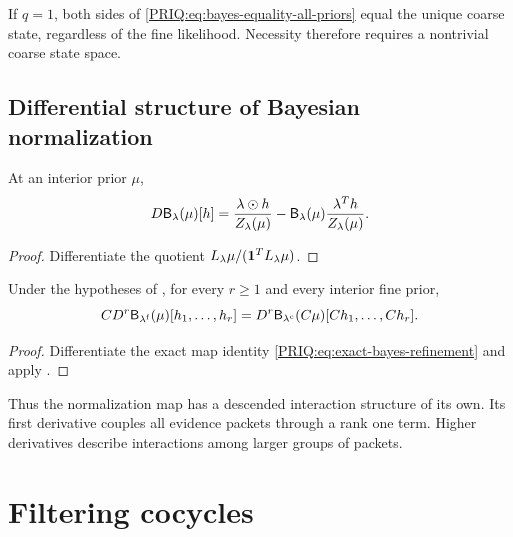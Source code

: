 \begin{PRIQremark}
If $q=1$, both sides of \eqref{PRIQ:eq:bayes-equality-all-priors} equal the unique coarse state, regardless of the fine likelihood.  Necessity therefore requires a nontrivial coarse state space.
\end{PRIQremark}

\subsection{Differential structure of Bayesian normalization}

\begin{PRIQproposition}\label{PRIQ:prop:bayes-differential}
At an interior prior $\mu$,
\begin{equation}\label{PRIQ:eq:bayes-differential}
  D\mathsf B_{\lambda}(\mu)[h]
  =
  \frac{\lambda\odot h}{Z_{\lambda}(\mu)}
  -
  \mathsf B_{\lambda}(\mu)
  \frac{\lambda^Th}{Z_{\lambda}(\mu)}.
\end{equation}
\end{PRIQproposition}

\begin{proof}
Differentiate the quotient $L_{\lambda}\mu/(\mathbf 1^TL_{\lambda}\mu)$.
\end{proof}

\begin{PRIQcorollary}\label{PRIQ:cor:bayes-jet-naturality}
Under the hypotheses of , for every $r\geq1$ and every interior fine prior,
\begin{equation}\label{PRIQ:eq:bayes-jet-naturality}
  C D^r\mathsf B_{\lambda^{\mathrm f}}(\mu)
  [h_1,\ldots,h_r]
  =
  D^r\mathsf B_{\lambda^{\mathrm c}}(C\mu)
  [Ch_1,\ldots,Ch_r].
\end{equation}
\end{PRIQcorollary}

\begin{proof}
Differentiate the exact map identity \eqref{PRIQ:eq:exact-bayes-refinement} and apply .
\end{proof}

Thus the normalization map has a descended interaction structure of its own.  Its first derivative couples all evidence packets through a rank one term.  Higher derivatives describe interactions among larger groups of packets.

\section{Filtering cocycles}\label{PRIQ:sec:cocycles}

